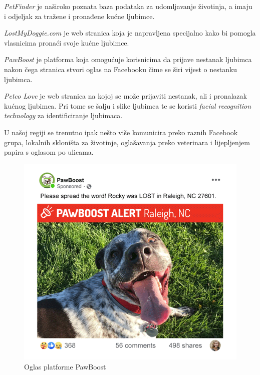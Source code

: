 		\begin{packed_item}		
		
			\item \textit{PetFinder} je naširoko poznata baza podataka za udomljavanje životinja, a imaju i odjeljak za tražene i pronađene kućne ljubimce.
		
			\item \textit{LostMyDoggie.com} je web stranica koja je napravljena specijalno kako bi pomogla vlasnicima pronaći svoje kućne ljubimce.
		
			\item \textit{PawBoost} je platforma koja omogućuje korisnicima da prijave nestanak ljubimca nakon čega stranica stvori oglas na Facebooku čime se širi vijest o nestanku ljubimca.
		
			\item \textit{Petco Love} je web stranica na kojoj se može prijaviti nestanak, ali i pronalazak kućnog ljubimca. Pri tome se šalju i slike ljubimca te se koristi \textit{facial recognition technology} za identificiranje ljubimaca.
		
		\end{packed_item}
		
		U našoj regiji se trenutno ipak nešto više komunicira preko raznih Facebook grupa, lokalnih skloništa za životinje, oglašavanja preko veterinara i lijepljenjem papira s oglasom po ulicama.\\
		
		\begin{figure}[H]
			\includegraphics[scale=0.5]{slike/pawBoost.PNG} 
			\centering
			\caption{Oglas platforme PawBoost}
			\label{pawBoost}
		\end{figure}
		
